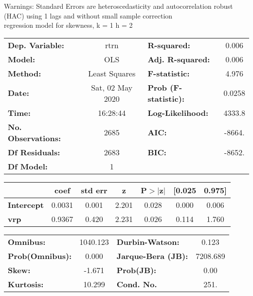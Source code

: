 Warnings: \newline
 [1] Standard Errors are heteroscedasticity and autocorrelation robust (HAC) using 1 lags and without small sample correction\\ 

regression model for skewness, k = 1 h = 2\begin{center}
\begin{tabular}{lclc}
\toprule
\textbf{Dep. Variable:}    &       rtrn       & \textbf{  R-squared:         } &     0.006   \\
\textbf{Model:}            &       OLS        & \textbf{  Adj. R-squared:    } &     0.006   \\
\textbf{Method:}           &  Least Squares   & \textbf{  F-statistic:       } &     4.976   \\
\textbf{Date:}             & Sat, 02 May 2020 & \textbf{  Prob (F-statistic):} &   0.0258    \\
\textbf{Time:}             &     16:28:44     & \textbf{  Log-Likelihood:    } &    4333.8   \\
\textbf{No. Observations:} &        2685      & \textbf{  AIC:               } &    -8664.   \\
\textbf{Df Residuals:}     &        2683      & \textbf{  BIC:               } &    -8652.   \\
\textbf{Df Model:}         &           1      & \textbf{                     } &             \\
\bottomrule
\end{tabular}
\begin{tabular}{lcccccc}
                   & \textbf{coef} & \textbf{std err} & \textbf{z} & \textbf{P$> |$z$|$} & \textbf{[0.025} & \textbf{0.975]}  \\
\midrule
\textbf{Intercept} &       0.0031  &        0.001     &     2.201  &         0.028        &        0.000    &        0.006     \\
\textbf{vrp}       &       0.9367  &        0.420     &     2.231  &         0.026        &        0.114    &        1.760     \\
\bottomrule
\end{tabular}
\begin{tabular}{lclc}
\textbf{Omnibus:}       & 1040.123 & \textbf{  Durbin-Watson:     } &    0.123  \\
\textbf{Prob(Omnibus):} &   0.000  & \textbf{  Jarque-Bera (JB):  } & 7208.689  \\
\textbf{Skew:}          &  -1.671  & \textbf{  Prob(JB):          } &     0.00  \\
\textbf{Kurtosis:}      &  10.299  & \textbf{  Cond. No.          } &     251.  \\
\bottomrule
\end{tabular}
\end{center}

